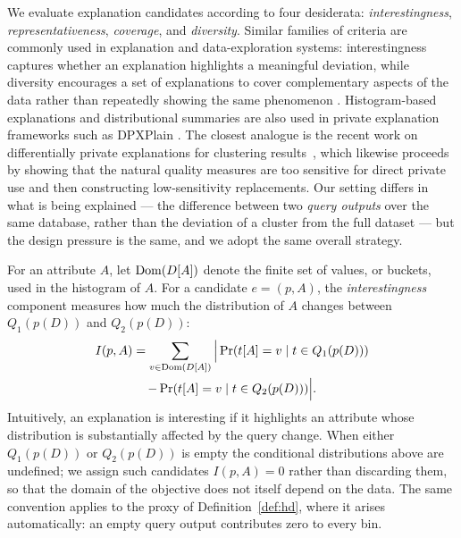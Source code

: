 We evaluate explanation candidates according to four desiderata: \emph{interestingness}, \emph{representativeness}, \emph{coverage}, and \emph{diversity}.
Similar families of criteria are commonly used in explanation and data-exploration systems: interestingness captures whether an explanation highlights a meaningful deviation, while diversity encourages a set of explanations to cover complementary aspects of the data rather than repeatedly showing the same phenomenon \cite{FEDEX}.
Histogram-based explanations and distributional summaries are also used in private explanation frameworks such as DPXPlain \cite{TaoGMR22}.
The closest analogue is the recent work on differentially private explanations for clustering results~\cite{DPClustX}, which likewise proceeds by showing that the natural quality measures are too sensitive for direct private use and then constructing low-sensitivity replacements.
Our setting differs in what is being explained --- the difference between two \emph{query outputs} over the same database, rather than the deviation of a cluster from the full dataset --- but the design pressure is the same, and we adopt the same overall strategy.

For an attribute $A$, let $\operatorname{Dom}(D[A])$ denote the finite set of values, or buckets, used in the histogram of $A$.
For a candidate $e=(p,A)$, the \emph{interestingness} component measures how much the distribution of $A$ changes between $Q_1(p(D))$ and $Q_2(p(D))$:
\begin{multline*}
I(p,A) = \sum_{v\in\operatorname{Dom}(D[A])} \Big|
\Pr(t[A]=v \mid t \in Q_1(p(D)))\\
-
\Pr(t[A]=v \mid t \in Q_2(p(D)))
\Big|.
\end{multline*}
Intuitively, an explanation is interesting if it highlights an attribute whose distribution is substantially affected by the query change.
When either $Q_1(p(D))$ or $Q_2(p(D))$ is empty the conditional distributions above are undefined; we assign such candidates $I(p,A)=0$ rather than discarding them, so that the domain of the objective does not itself depend on the data.
The same convention applies to the proxy of Definition~\ref{def:hd}, where it arises automatically: an empty query output contributes zero to every bin.

